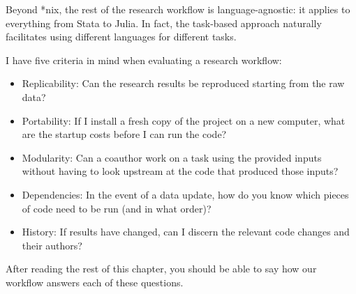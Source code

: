 Beyond *nix, the rest of the research workflow is language-agnostic:
it applies to everything from Stata to Julia.
In fact, the task-based approach naturally facilitates using different languages for different tasks.

I have five criteria in mind when evaluating a research workflow:
\begin{itemize}
\item Replicability:
Can the research results be reproduced starting from the raw data?
\item Portability:
If I install a fresh copy of the project on a new computer, what are the startup costs before I can run the code?
\item Modularity:
Can a coauthor work on a task using the provided inputs without having to look upstream at the code that produced those inputs?
\item Dependencies:
In the event of a data update, how do you know which pieces of code need to be run (and in what order)?
\item History:
If results have changed, can I discern the relevant code changes and their authors?
\end{itemize}
After reading the rest of this chapter, you should be able to say how our workflow answers each of these questions.
